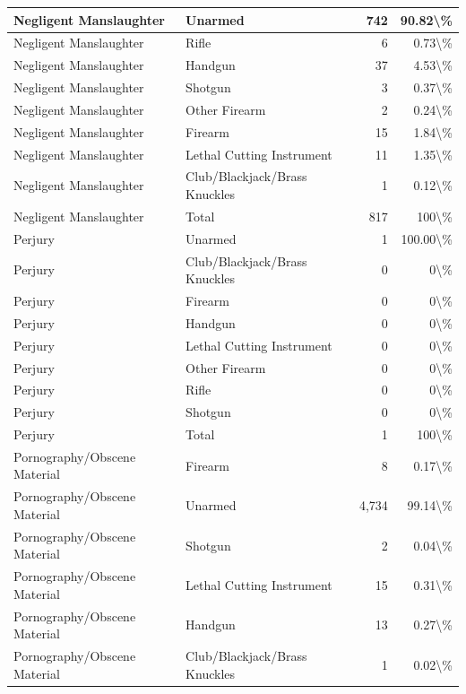\documentclass[
]{krantz}
\begin{document}
\begin{longtable}[t]{l|l|r|r}
\hline
Negligent Manslaughter & Unarmed & 742 & 90.82\textbackslash{}\%\\
\hline
Negligent Manslaughter & Rifle & 6 & 0.73\textbackslash{}\%\\
\hline
Negligent Manslaughter & Handgun & 37 & 4.53\textbackslash{}\%\\
\hline
Negligent Manslaughter & Shotgun & 3 & 0.37\textbackslash{}\%\\
\hline
Negligent Manslaughter & Other Firearm & 2 & 0.24\textbackslash{}\%\\
\hline
Negligent Manslaughter & Firearm & 15 & 1.84\textbackslash{}\%\\
\hline
Negligent Manslaughter & Lethal Cutting Instrument & 11 & 1.35\textbackslash{}\%\\
\hline
Negligent Manslaughter & Club/Blackjack/Brass Knuckles & 1 & 0.12\textbackslash{}\%\\
\hline
Negligent Manslaughter & Total & 817 & 100\textbackslash{}\%\\
\hline
Perjury & Unarmed & 1 & 100.00\textbackslash{}\%\\
\hline
Perjury & Club/Blackjack/Brass Knuckles & 0 & 0\textbackslash{}\%\\
\hline
Perjury & Firearm & 0 & 0\textbackslash{}\%\\
\hline
Perjury & Handgun & 0 & 0\textbackslash{}\%\\
\hline
Perjury & Lethal Cutting Instrument & 0 & 0\textbackslash{}\%\\
\hline
Perjury & Other Firearm & 0 & 0\textbackslash{}\%\\
\hline
Perjury & Rifle & 0 & 0\textbackslash{}\%\\
\hline
Perjury & Shotgun & 0 & 0\textbackslash{}\%\\
\hline
Perjury & Total & 1 & 100\textbackslash{}\%\\
\hline
Pornography/Obscene Material & Firearm & 8 & 0.17\textbackslash{}\%\\
\hline
Pornography/Obscene Material & Unarmed & 4,734 & 99.14\textbackslash{}\%\\
\hline
Pornography/Obscene Material & Shotgun & 2 & 0.04\textbackslash{}\%\\
\hline
Pornography/Obscene Material & Lethal Cutting Instrument & 15 & 0.31\textbackslash{}\%\\
\hline
Pornography/Obscene Material & Handgun & 13 & 0.27\textbackslash{}\%\\
\hline
Pornography/Obscene Material & Club/Blackjack/Brass Knuckles & 1 & 0.02\textbackslash{}\%\\

\end{longtable}
\end{document}
